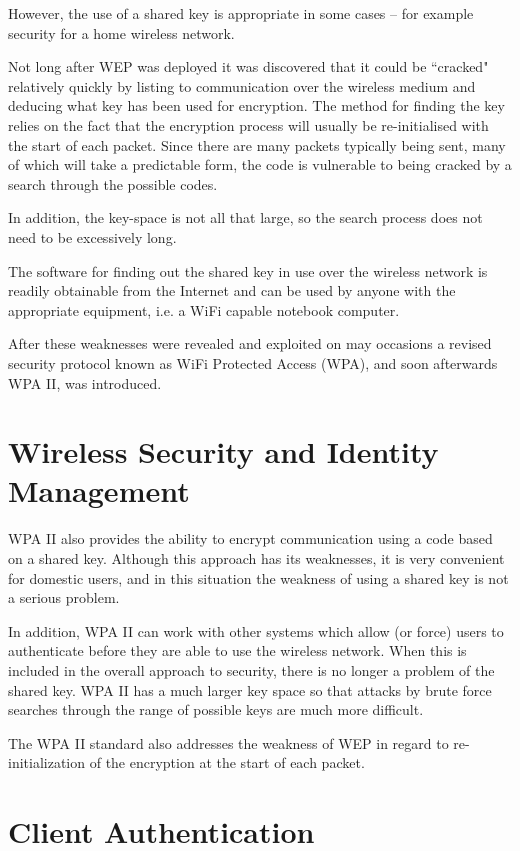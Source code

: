 However, the use of a shared key is appropriate in some cases – for example security for a home wireless network.

Not long after WEP was deployed it was discovered that it could be ``cracked" relatively
quickly by listing to communication over the wireless medium and deducing what key has
been used for encryption. The method for finding the key relies on the fact that the encryption process will usually be re-initialised with the start of each packet. Since there are many packets typically being sent, many of which will take a predictable form, the code is vulnerable to being cracked by a search through the possible codes. 

In addition, the key-space is not all that large, so the search process does not need to be excessively long.

The software for finding out the shared key in use over the wireless network is readily obtainable from the Internet and can be used by anyone with the appropriate equipment, i.e. a WiFi capable notebook computer.

After these weaknesses were revealed and exploited on may occasions a revised security protocol known as WiFi Protected Access (WPA), and soon afterwards WPA II, was introduced.

\section{Wireless Security and Identity Management}

WPA II also provides the ability to encrypt communication using a code based on a shared
key. Although this approach has its weaknesses, it is very convenient for domestic users, and in this situation the weakness of using a shared key is not a serious problem.

In addition, WPA II can work with other systems which allow (or force) users to authenticate before they are able to use the wireless network. When this is included in the overall approach to security, there is no longer a problem of the shared key. WPA II has a much larger key space so that attacks by brute force searches through the range of possible keys are much more difficult. 

The WPA II standard also addresses the weakness of WEP in regard to re-initialization of the encryption at the start of each packet.

\section{Client Authentication}

